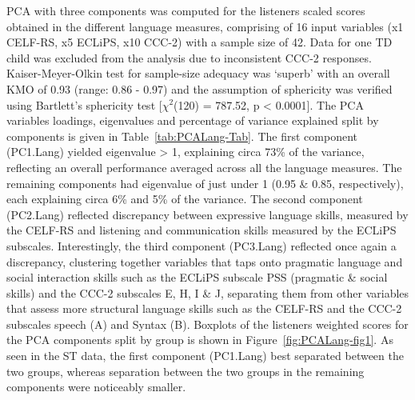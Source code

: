\documentclass[a4paper, twoside]{templates/ociamthesis}
\begin{document}
PCA with three components was computed for the listeners scaled scores obtained in the different language measures, comprising of 16 input variables (x1 CELF-RS, x5 ECLiPS, x10 CCC-2) with a sample size of 42. Data for one TD child was excluded from the analysis due to inconsistent CCC-2 responses. Kaiser-Meyer-Olkin test for sample-size adequacy was `superb' \autocite{Field2012Chpt17} with an overall KMO of 0.93 (range: 0.86 - 0.97) and the assumption of sphericity was verified using Bartlett's sphericity test {[}\(\chi^2\)(120) = 787.52, p \textless{} 0.0001{]}. The PCA variables loadings, eigenvalues and percentage of variance explained split by components is given in Table~\ref{tab:PCALang-Tab}. The first component (PC1.Lang) yielded eigenvalue \textgreater{} 1, explaining circa 73\% of the variance, reflecting an overall performance averaged across all the language measures. The remaining components had eigenvalue of just under 1 (0.95 \& 0.85, respectively), each explaining circa 6\% and 5\% of the variance. The second component (PC2.Lang) reflected discrepancy between expressive language skills, measured by the CELF-RS and listening and communication skills measured by the ECLiPS subscales. Interestingly, the third component (PC3.Lang) reflected once again a discrepancy, clustering together variables that taps onto pragmatic language and social interaction skills such as the ECLiPS subscale PSS (pragmatic \& social skills) and the CCC-2 subscales E, H, I \& J, separating them from other variables that assess more structural language skills such as the CELF-RS and the CCC-2 subscales speech (A) and Syntax (B). Boxplots of the listeners weighted scores for the PCA components split by group is shown in Figure~\ref{fig:PCALang-fig1}. As seen in the ST data, the first component (PC1.Lang) best separated between the two groups, whereas separation between the two groups in the remaining components were noticeably smaller.\\
\end{document}
